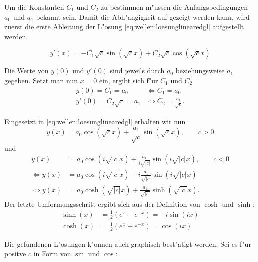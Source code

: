 Um die Konstanten $C_1$ und $C_2$ zu bestimmen m"ussen die Anfangsbedingungen 
$a_0$ und $a_1$ bekannt sein. Damit die Abh"angigkeit auf gezeigt werden kann, 
wird zuerst die erste Ableitung der L"osung \ref{eq:wellen:loesunglinearedgl} 
aufgestellt werden.

\begin{equation}
	y'(x)=-C_1 \sqrt{c} \sin(\sqrt{c}x) + C_2 \sqrt{c} \cos(\sqrt{c}x)
\end{equation}

Die Werte von $y(0)$ und $y'(0)$ sind jeweils durch $a_0$ beziehungsweise $a_1$ 
gegeben. Setzt man nun $x = 0$ ein, ergibt sich f"ur $C_1$ und $C_2$
\begin{equation}
	\begin{split}
		y(0) = C_1 = a_0 &\Leftrightarrow C_1 = a_0 \\
		y'(0) = C_2 \sqrt{c} = a_1 &\Leftrightarrow C_2 = \frac{a_1}{\sqrt{c}}.
	\end{split}
\end{equation}

Eingesetzt in \ref{eq:wellen:loesunglinearedgl} erhalten wir nun
\begin{equation*}
	y(x) = a_0 \cos(\sqrt{c}x) + \frac{a_1}{\sqrt{c}} \sin(\sqrt{c}x), \qquad c 
	> 0
\end{equation*}
und
\begin{equation}
\begin{split}
	y(x) &= a_0 \cos(i\sqrt{|c|}x) + \frac{a_1}{i\sqrt{|c|}}\sin(i\sqrt{|c|}x), 
	\qquad c < 0\\
	\Leftrightarrow
	y(x) &= a_0 \cos(i\sqrt{|c|}x) - i\frac{a_1}{\sqrt{|c|}}\sin(i\sqrt{|c|}x)\\
	\Leftrightarrow
	y(x) &= a_0 \cosh(\sqrt{|c|}x) + \frac{a_1}{\sqrt{|c|}}\sinh(\sqrt{|c|}x).
\end{split}	
\end{equation}
Der letzte Umformungsschritt ergibt sich aus der Definition von $\cosh$ und 
$\sinh$:
\begin{equation*}
\begin{split}
	\sinh(x) &= \frac{1}{2} (e^x - e^{-x}) = -i \sin(ix)\\
	\cosh(x) &= \frac{1}{2} (e^x + e^{-x}) = \cos (ix)
\end{split}
\end{equation*}

Die gefundenen L"osungen k"onnen auch graphisch best"atigt werden. Sei es f"ur 
positve $c$ in Form von $\sin$ und $\cos$:

